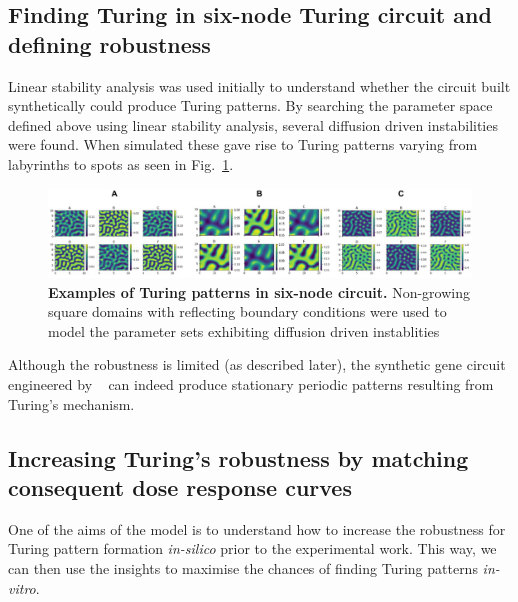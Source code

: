 \subsection{Finding Turing in six-node Turing circuit and defining robustness}
Linear stability analysis was used initially to understand whether the circuit built synthetically could produce Turing patterns.
By searching the parameter space defined above using linear stability analysis, several diffusion driven instabilities were found. When simulated these gave rise to Turing patterns varying from labyrinths to spots as seen in Fig.~\ref{fig:square_turing}.

\begin{figure}[H]
    \centering
    \includegraphics[width=1\textwidth]{chapters/Chapter 2/square_turing}
    \caption[]{\textbf{Examples of Turing patterns in six-node circuit.} Non-growing square domains with reflecting boundary conditions were used to model the parameter sets exhibiting diffusion driven instablities} %
    \label{fig:square_turing}
\end{figure}

Although the robustness is limited (as described later), the synthetic gene circuit engineered by ~\cite{Tica2020} can indeed produce stationary periodic patterns resulting from Turing's mechanism.
\subsection{Increasing Turing's robustness by matching consequent dose response curves}\label{balancing}
One of the aims of the model is to understand how to increase the robustness for Turing pattern formation \textit{in-silico} prior to the experimental work.
This way, we can then use the insights to maximise the chances of finding Turing patterns \textit{in-vitro}.


